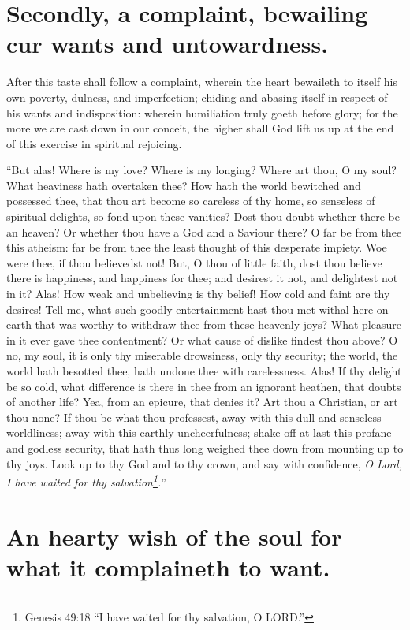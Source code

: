 \section{Secondly, a complaint, bewailing cur wants and untowardness.}

After this taste shall follow a complaint, wherein the heart bewaileth to itself his own poverty, dulness, and imperfection; chiding and abasing itself in respect of his wants and indisposition: wherein humiliation truly goeth before glory; for the more we are cast down in our conceit, the higher shall God lift us up at the end of this exercise in spiritual rejoicing. 

``But alas! Where is my love? Where is my longing? Where art thou, O my soul? What heaviness hath overtaken thee? How hath the world bewitched and possessed thee, that thou art become so careless of thy home, so senseless of spiritual delights, so fond upon these vanities? Dost thou doubt whether there be an heaven? Or whether thou have a God and a Saviour there? O far be from thee this atheism: far be from thee the least thought of this desperate impiety. Woe were thee, if thou believedst not! But, O thou of little faith, dost thou believe there is happiness, and happiness for thee; and desirest it not, and delightest not in it? Alas! How weak and unbelieving is thy belief! How cold and faint are thy desires! Tell me, what such goodly entertainment hast thou met withal here on earth that was worthy to withdraw thee from these heavenly joys? What pleasure in it ever gave thee contentment? Or what cause of dislike findest thou above? O no, my soul, it is only thy miserable drowsiness, only thy security; the world, the world hath besotted thee, hath undone thee with carelessness. Alas! If thy delight be so cold, what difference is there in thee from an ignorant heathen, that doubts of another life? Yea, from an epicure, that denies it? Art thou a Christian, or art thou none? If thou be what thou professest, away with this dull and senseless worldliness; away with this earthly uncheerfulness; shake off at last this profane and godless security, that hath thus long weighed thee down from mounting up to thy joys. Look up to thy God and to thy crown, and say with confidence, \emph{O Lord, I have waited for thy salvation\footnote{Genesis 49:18 ``I have waited for thy salvation, O LORD.''}.}''

\section{An hearty wish of the soul for what it complaineth to want.}

